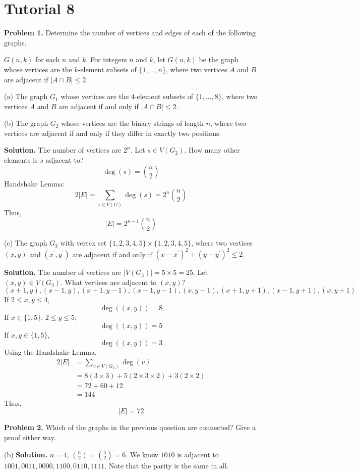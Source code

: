 \section{Tutorial 8}
\textbf{Problem 1.} Determine the number of vertices
and edges of each of the following graphs.

$ G(n,k) $ for each $ n $ and $ k $. For integers $ n $ and $ k $,
let $ G(n,k) $ be the graph whose vertices are the $ k $-element subsets
of $ \{1,\ldots ,n\} $, where two vertices $ A $ and $ B $ are
adjacent if $ |A\cap B|\leqslant 2 $.

(a) The graph $ G_1 $ whose vertices are the $ 4 $-element subsets of
$ \{1,\ldots ,8\} $, where two vertices $ A $ and $ B $ are adjacent
if and only if $ |A\cap B|\leqslant 2 $.

(b) The graph $ G_2 $ whose vertices are the binary strings of length $ n $,
where two vertices are adjacent if and only if they differ in exactly
two positions.

\textbf{Solution.} The number of vertices are $ 2^n $.
Let $ s\in V(G_2) $. How many other elements is $ s $ adjacent to?
\[ \deg(s)=\binom{n}{2} \]
Handshake Lemma:
\[ 2|E|=\sum\limits_{s\in V(G)}\deg(s)=2^n\binom{n}{2} \]
Thus,
\[ |E|=2^{n-1}\binom{n}{2} \]

(c) The graph $ G_3 $ with vertex set $ \{1,2,3,4,5\}\times \{1,2,3,4,5\} $,
where two vertices $ (x,y) $ and $ (x^\prime, y^\prime) $ are
adjacent if and only if $ (x-x^\prime)^2+(y-y^\prime)^2\leqslant 2 $.

\textbf{Solution.} The number of vertices are $ |V(G_3)|=5\times 5=25 $.
Let $ (x,y)\in V(G_3) $. What vertices are adjacent to $ (x,y) $?
\[ (x+1,y),(x-1,y),(x+1,y-1),(x-1,y-1),(x,y-1),(x+1,y+1),(x-1,y+1),(x,y+1) \]
If $ 2\leqslant x,y \leqslant 4 $,
\[ \deg((x,y))=8 \]
If $ x\in \{1,5\} $, $ 2\leqslant y\leqslant 5 $,
\[ \deg((x,y))=5 \]
If $ x,y\in \{1,5\} $,
\[ \deg((x,y))=3 \]
Using the Handshake Lemma,
\begin{align*}
    2|E|
    &=\sum\limits_{v\in V(G_3)} \deg(v)\\
    &=8(3\times 3)+5(2\times 3\times 2)+3(2\times 2)\\
    &=72+60+12\\
    &=144
\end{align*}
Thus,
\[ |E|=72 \]

\textbf{Problem 2.} Which of the graphs in the previous question are connected?
Give a proof either way.

(b) \textbf{Solution.} $ n=4 $, $ \binom{n}{2}=\binom{4}{2}=6 $.
We know $ 1010 $ is adjacent to $ 1001,0011,0000,1100,0110,1111 $.
Note that the parity is the same in all.

